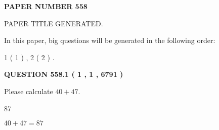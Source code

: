 \documentclass[12pt]{article}
\begin{document}
   
   
   
\newpage 
\setcounter{page}{ 
   558001 } 
   
   
   
   
 {\textbf{ \Large{ PAPER NUMBER  558  }}}
   
   
\vspace{0.2in}
   
   
   
   
   
   
   
   
 \vspace{0.2in}
 
 
 
 
   
   
 PAPER TITLE GENERATED.
   
   
   
\vspace{0.2in}
   
In this paper, big questions will be generated in the following order: 
   
   
   1 ( 1 )
 ,
   2 ( 2 )
 .
  
\vspace{0.2in}
  
{\textbf{\Large{QUESTION
558.1 
 ( 1 , 1 , 6791 )
}}}
  
  
 
Please calculate $ %
40 +  %
47 $.
 
 
 
\noindent{}
 
 

87
 
 
\noindent{}
 
 

 
 
 
\noindent{}
 
 

$ %
40 +  %
47=   %
87$
 
 
\noindent{}
 
 

 
   
   
   
\end{document}
